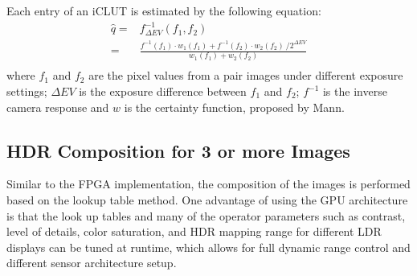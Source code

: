 Each entry of an iCLUT is estimated by the following equation: 
\begin{equation}\label{joint_est}
\begin{split}
  \hat{q}=&f^{-1}_{\Delta EV}(f_1, f_2) \\
  =&\frac{f^{-1}(f_1) \cdot w_1(f_1)+f^{-1}(f_2) \cdot w_2(f_2) \
      / 2^{\Delta EV}}{w_1(f_1)+w_2(f_2)}\\
\end{split}
\end{equation} 
where $f_1$ and $f_2$ are the pixel values from a pair images under different exposure settings; $
\Delta EV$ is the exposure difference between $f_1$ and $f_2$; $f^{-1}$ is the inverse camera 
response and $w$ is the certainty function, proposed by Mann\cite{mannist}.



\subsection{HDR Composition for 3 or more Images} \label{comp3_set} 
Similar to the FPGA implementation, the composition of the images is performed based on the lookup 
table method. One advantage of using the GPU architecture is that the look up tables and many of 
the operator parameters such as contrast, level of details, color saturation, and HDR mapping range 
for different LDR displays can be tuned at runtime, which allows for full dynamic range control and 
different sensor architecture setup. 

